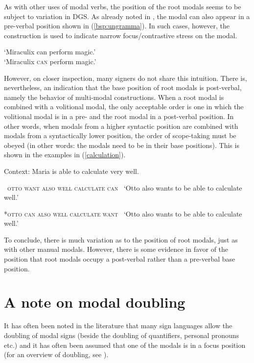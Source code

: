 \noindent As with other uses of modal verbs, the position of the root modals seems to be subject to variation in DGS. As already noted in \citet[23]{bross2017scope}, the modal can also appear in a pre-verbal position shown in (\ref{bsp:ungramma}). In such cases, however, the construction is used to indicate narrow focus/contrastive stress on the modal.

\begin{exe}
   \label{bsp:ungramma} 
\glt *\phantom{\cmark} `Miraculix can perform magic.' \\
\cmark\phantom{*} `Miraculix \textsc{can} perform magic.'
\end{exe}

\largerpage
\noindent However, on closer inspection, many signers do not share this intuition. There is, nevertheless, an indication that the base position of root modals is post-verbal, namely the behavior of multi-modal constructions. When a root modal is combined with a volitional modal, the only acceptable order is one in which the volitional modal is in a pre- and the root modal in a post-verbal position. In other words, when modals from a higher syntactic position are combined with modals from a syntactically lower position, the order of scope-taking must be obeyed (in other words: the modals need to be in their base positions). This is shown in the examples in (\ref{calculation}).

\begin{exe}
\ex Context: Maria is able to calculate very well.\label{calculation}\begin{xlist}
\ex\label{bsp:calculatea}
{\textcolor{white}{*}\textsc{otto want also well calculate can}}    
\glt \textcolor{white}{*}`Otto also wants to be able to calculate well.' 

\ex\label{bsp:calculateb}
{*\textsc{otto can also well calculate want}}    
\glt \textcolor{white}{*}`Otto also wants to be able to calculate well.' 

\end{xlist}
\end{exe}

\noindent To conclude, there is much variation as to the position of root modals, just as with other manual modals. However, there is some evidence in favor of the position that root modals occupy a post-verbal rather than a pre-verbal base position. 


\section{A note on modal doubling}\label{modaldoubling}
It has often been noted in the literature that many sign languages allow the doubling of modal signs (beside the doubling of quantifiers, personal pronouns etc.) and it has often been assumed that one of the modals is in a focus position (for an overview of doubling, see \citealt{petronio1993clause,nunesquadros2008phonetically}).

